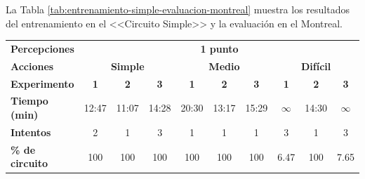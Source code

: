 La Tabla \ref{tab:entrenamiento-simple-evaluacion-montreal} muestra los resultados del entrenamiento en el <<Circuito Simple>> y la evaluación en el Montreal.

\newpage

\begin{table}[ht!]
\centering
\begin{tabular}{|l|c|c|c|c|c|c|c|c|c|}
\hline
\rowcolor[HTML]{EFEFEF} 
\multicolumn{10}{|c|}{\cellcolor[HTML]{EFEFEF}\textbf{Entrenamiento en Circuito Simple y ejecución en Montreal}}                                                                                                                                        \\ \hline
\rowcolor[HTML]{EFEFEF} 
\textbf{Percepciones}                           & \multicolumn{9}{c|}{\cellcolor[HTML]{EFEFEF}\textbf{1 punto}}                                                                                                                                         \\ \hline
\rowcolor[HTML]{EFEFEF} 
\textbf{Acciones}                               & \multicolumn{3}{c|}{\cellcolor[HTML]{EFEFEF}\textbf{Simple}} & \multicolumn{3}{c|}{\cellcolor[HTML]{EFEFEF}\textbf{Medio}} & \multicolumn{3}{c|}{\cellcolor[HTML]{EFEFEF}\textbf{Difícil}}            \\ \hline
\rowcolor[HTML]{EFEFEF} 
\textbf{Experimento}                            & \textbf{1}   & \textbf{2}                      & \textbf{3}  & \textbf{1}   & \textbf{2}                     & \textbf{3}  & \textbf{1}                   & \textbf{2} & \textbf{3}                   \\ \hline
\rowcolor[HTML]{FFFFFF} 
\cellcolor[HTML]{EFEFEF}\textbf{Tiempo (min)}   & 12:47        & 11:07                           & 14:28       & 20:30        & 13:17                          & 15:29       & $\infty$                     & 14:30      & $\infty$                     \\ \hline
\rowcolor[HTML]{FFFFFF} 
\cellcolor[HTML]{EFEFEF}\textbf{Intentos}       & 2            & 1                               & 3           & 1            & 1                              & 1           & 3                            & 1          & 3                            \\ \hline
\rowcolor[HTML]{32CB00} 
\cellcolor[HTML]{EFEFEF}\textbf{\% de circuito} & 100          & 100                             & 100         & 100          & 100                            & 100         & \cellcolor[HTML]{FFC702}6.47 & 100        & \cellcolor[HTML]{FFC702}7.65 \\ \hline

\end{tabular}
\end{table}
